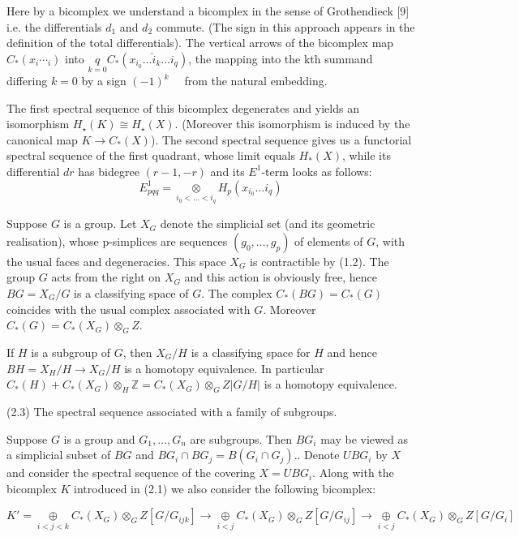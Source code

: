 Here by a bicomplex we understand a bicomplex in the sense of Grothendieck [9] i.e. the differentials $d_1$ and $d_2$ commute. (The sign in this approach appears in the definition of the total differentials). The vertical arrows of the bicomplex map $C_*\left(x_i \cdots_i\right)$ into $\underset{k=0}{q} C_*\left(x_{i_0} \ldots \hat{i}_k \ldots i_q\right)$, the mapping into the kth summand differing $k=0$ by a sign $(-1)^k \quad$ from the natural embedding.

The first spectral sequence of this bicomplex degenerates and yields an isomorphism $H_{\star}(K) \cong H_{\star}(X)$. (Moreover this isomorphism is induced by the canonical map $K \rightarrow C_*(X)$). The second spectral sequence gives us a functorial spectral sequence of the first quadrant, whose limit equals $H_*(X)$, while its differential $d r$ has bidegree $(r-1,-r)$ and its $E^1$-term looks as follows: $$E_{p q q}^1=\underset{i_0<\ldots<i_q}{\otimes} H_p\left(x_{i_0} \ldots i_q\right)$$

Suppose $G$ is a group. Let $X_G$ denote the simplicial set (and its geometric realisation), whose p-simplices are sequences $\left(g_0, \ldots, g_p\right)$ of elements of $G$, with the usual faces and degeneracies. This space $X_G$ is contractible by (1.2). The group $G$ acts from the right on $X_G$ and this action is obviously free, hence $B G=X_G / G$ is a classifying space of $G$. The complex $C_*(B G)=C_*(G)$ coincides with the usual complex associated with $G$. Moreover $C_*(G)=C_*\left(X_G\right) \otimes_G Z$.

If $H$ is a subgroup of $G$, then $X_G / H$ is a classifying space for $H$ and hence $B H=X_H / H \rightarrow X_G / H$ is a homotopy equivalence. In particular $C_*(H)+C_*\left(X_G\right) \otimes_H \mathbb{Z}=C_*\left(X_G\right) \otimes_G Z|G / H|$ is a homotopy equivalence.

(2.3) The spectral sequence associated with a family of subgroups.

Suppose $G$ is a group and $G_1, \ldots, G_n$ are subgroups. Then $B G_i$ may be viewed as a simplicial subset of $B G$ and $B G_i \cap B G_j=B\left(G_i \cap G_j\right)$.. Denote $U B G_i$ by $X$ and consider the spectral sequence of the covering $X=U B G_i$. Along with the bicomplex $K$ introduced in (2.1) we also consider the following bicomplex:

$$K' = \underset{i<j<k}{\oplus} C_*\left(X_G\right) \otimes_G Z\left[G / G_{i j k}\right] \longrightarrow \underset{i<j}{\oplus} C_*\left(X_G\right) \otimes_G Z\left[G / G_{i j}\right] \longrightarrow \underset{i<j}{\oplus} C_*\left(X_G\right) \otimes_G Z\left[G / G_{i}\right] $$

